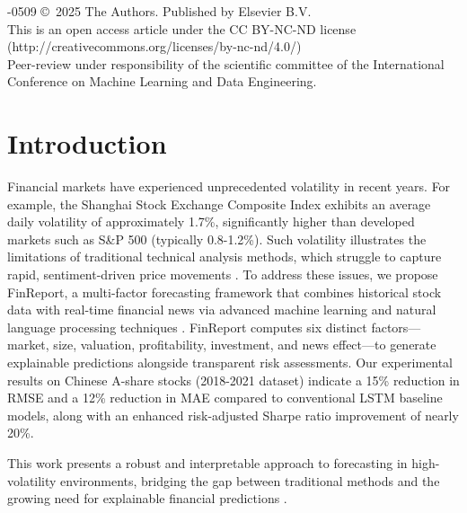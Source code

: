 \documentclass[3p,times,procedia]{elsarticle}
\begin{document}
\vspace{6pt}
-0509 \copyright\ 2025 The Authors. Published by Elsevier B.V.\\
This is an open access article under the CC BY-NC-ND license (http://creativecommons.org/licenses/by-nc-nd/4.0/)\\
Peer-review under responsibility of the scientific committee of the International Conference on Machine Learning and Data Engineering.

\vspace{12pt}

\section{Introduction}
\label{main}

Financial markets have experienced unprecedented volatility in recent years. For example, the Shanghai Stock Exchange Composite Index exhibits an average daily volatility of approximately 1.7\%, significantly higher than developed markets such as S\&P 500 (typically 0.8-1.2\%). Such volatility illustrates the limitations of traditional technical analysis methods, which struggle to capture rapid, sentiment-driven price movements \cite{FAMA1993}. To address these issues, we propose FinReport, a multi-factor forecasting framework that combines historical stock data with real-time financial news via advanced machine learning and natural language processing techniques \cite{hochreiter1997lstm}. FinReport computes six distinct factors---market, size, valuation, profitability, investment, and news effect---to generate explainable predictions alongside transparent risk assessments. Our experimental results on Chinese A-share stocks (2018-2021 dataset) \cite{FinReportDataset2025} indicate a 15\% reduction in RMSE and a 12\% reduction in MAE compared to conventional LSTM baseline models, along with an enhanced risk-adjusted Sharpe ratio improvement of nearly 20\%.

This work presents a robust and interpretable approach to forecasting in high-volatility environments, bridging the gap between traditional methods and the growing need for explainable financial predictions \cite{TETLOCK2007}.
\end{document}
